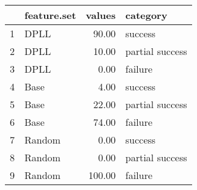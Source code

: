 \begin{table}[ht]
\centering
\begin{tabular}{rlrl}
  \hline
 & feature.set & values & category \\ 
  \hline
1 & DPLL & 90.00 & success \\ 
  2 & DPLL & 10.00 & partial success \\ 
  3 & DPLL & 0.00 & failure \\ 
  4 & Base & 4.00 & success \\ 
  5 & Base & 22.00 & partial success \\ 
  6 & Base & 74.00 & failure \\ 
  7 & Random & 0.00 & success \\ 
  8 & Random & 0.00 & partial success \\ 
  9 & Random & 100.00 & failure \\ 
   \hline
\end{tabular}
\end{table}

